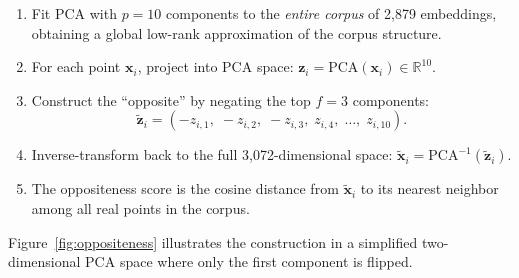\begin{enumerate}
    \item Fit PCA with $p = 10$ components to the \emph{entire corpus} of 2,879 embeddings, obtaining a global low-rank approximation of the corpus structure.
    \item For each point $\mathbf{x}_i$, project into PCA space: $\mathbf{z}_i = \text{PCA}(\mathbf{x}_i) \in \mathbb{R}^{10}$.
    \item Construct the ``opposite'' by negating the top $f = 3$ components:
    \[
    \tilde{\mathbf{z}}_i = (-z_{i,1},\; -z_{i,2},\; -z_{i,3},\; z_{i,4},\; \ldots,\; z_{i,10}).
    \]
    \item Inverse-transform back to the full 3,072-dimensional space: $\tilde{\mathbf{x}}_i = \text{PCA}^{-1}(\tilde{\mathbf{z}}_i)$.
    \item The oppositeness score is the cosine distance from $\tilde{\mathbf{x}}_i$ to its nearest neighbor among all real points in the corpus.
\end{enumerate}

Figure~\ref{fig:oppositeness} illustrates the construction in a simplified two-dimensional PCA space where only the first component is flipped.

